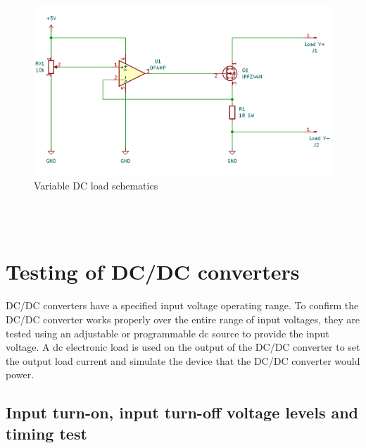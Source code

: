 \\ \\
\begin{figure}[h]
	\centering
	\includegraphics[width=\columnwidth]{IMGS/LoadSchematic.png}
	\caption{Variable DC load schematics}
	\label{fig:arch}
\end{figure} 
\\ \\	
\section{Testing of DC/DC converters}
DC/DC converters have a specified input voltage operating range. To confirm the DC/DC converter works properly over the entire range of input voltages, they are tested using an adjustable or programmable dc source to provide the input voltage. A dc electronic load is used on the output of the DC/DC converter to set the output load current and simulate the device that the DC/DC converter would power.

\subsection{Input turn-on, input turn-off voltage levels and timing test}

